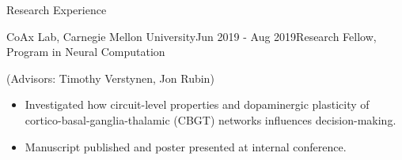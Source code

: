 \documentclass{resume} %
\begin{document}
\begin{rSection}{Research Experience}
\newpage
\begin{rSubsection}{CoAx Lab, Carnegie Mellon University}{Jun 2019 - Aug 2019}{Research Fellow, Program in Neural Computation}{}
\item (Advisors: Timothy Verstynen, Jon Rubin)
\begin{itemize}
    \item Investigated how circuit-level properties and dopaminergic plasticity of cortico-basal-ganglia-thalamic (CBGT) networks influences decision-making.
    \item Manuscript published and poster presented at internal conference. 
\end{itemize}
\end{rSubsection}

\end{rSection}
\end{document}
